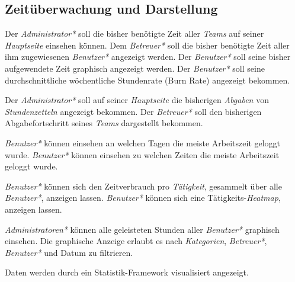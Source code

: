 \subsection{Zeitüberwachung und Darstellung}
    \begin{requirements}
        \begin{requirements}
             Der \emph{Administrator*} soll die bisher benötigte Zeit aller \emph{Teams} auf seiner \emph{Hauptseite} einsehen können.
             Dem \emph{Betreuer*} soll die bisher benötigte Zeit aller ihm zugewiesenen \emph{Benutzer*} angezeigt werden.
             Der \emph{Benutzer*} soll seine bisher aufgewendete Zeit graphisch angezeigt werden.
             Der \emph{Benutzer*} soll seine durchschnittliche wöchentliche Stundenrate (Burn Rate) angezeigt bekommen.
        \end{requirements}

        \begin{requirements}
             Der \emph{Administrator*} soll auf seiner \emph{Hauptseite} die bisherigen \emph{Abgaben} von \emph{Stundenzetteln} angezeigt bekommen.
             Der \emph{Betreuer*} soll den bisherigen Abgabefortschritt seines \emph{Teams} dargestellt bekommen.
        \end{requirements}

        \begin{requirements}
             \emph{Benutzer*} können einsehen an welchen Tagen die meiste Arbeitszeit geloggt wurde.
             \emph{Benutzer*} können einsehen zu welchen Zeiten die meiste Arbeitszeit geloggt wurde.
        \end{requirements}

        \begin{requirements}
             \emph{Benutzer*} können sich den Zeitverbrauch pro \emph{Tätigkeit}, gesammelt über alle \emph{Benutzer*}, anzeigen lassen.
             \emph{Benutzer*} können sich eine Tätigkeits-\emph{Heatmap}, anzeigen lassen.
        \end{requirements}
        
        \begin{requirements}
              \emph{Administratoren*} können alle geleisteten Stunden aller \emph{Benutzer*} graphisch einsehen.
              Die graphische Anzeige erlaubt es nach \emph{Kategorien}, \emph{Betreuer*}, \emph{Benutzer*} und Datum zu filtrieren.
        \end{requirements}

        Daten werden durch ein Statistik-Framework visualisiert angezeigt.
    \end{requirements}

